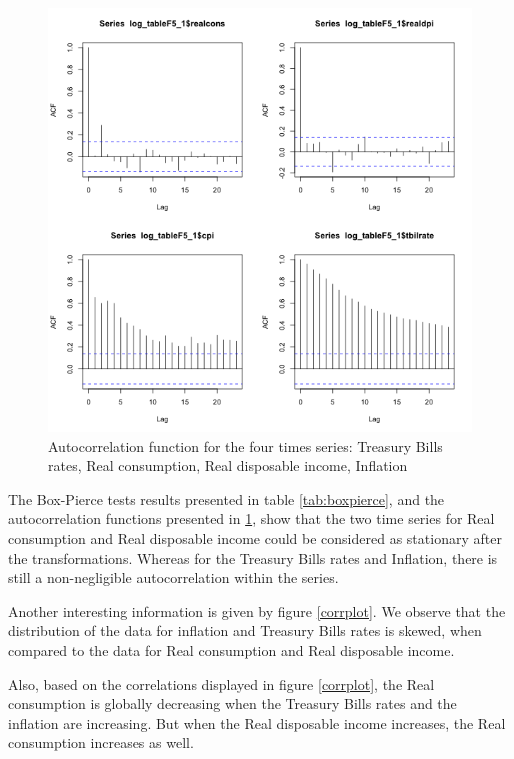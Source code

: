 \begin{figure}[!htb]
\centering
\includegraphics[width=12cm]{gfx/chapter-rvfl-ensembles/acf.png}
\caption{Autocorrelation function for the four times series: Treasury Bills rates, Real consumption, Real disposable income, Inflation}
\label{acf}
\end{figure}

\newpage

The Box-Pierce tests results presented in table \ref{tab:boxpierce}, and the autocorrelation functions presented in \ref{acf}, show that the two time series for Real consumption and Real disposable income could be considered as stationary after the transformations. Whereas for the Treasury Bills rates and Inflation, there is still a non-negligible autocorrelation within the series. 

\medskip

Another interesting information is given by figure \ref{corrplot}. We observe that the distribution of the data for inflation and Treasury Bills rates is skewed, when compared to the data for Real consumption and Real disposable income. 

\medskip

Also, based on the correlations displayed in figure \ref{corrplot}, the Real consumption is globally  decreasing when the Treasury Bills rates and the inflation are increasing. But when the Real disposable income increases, the Real consumption increases as well. 

